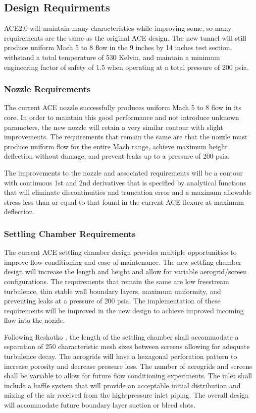 \subsection{Design Requirments}

ACE2.0 will maintain many characteristics while improving some, so many requirements are the same as the original ACE design. The new tunnel will still produce uniform Mach 5 to 8 flow in the 9 inches by 14 inches test section, withstand a total temperature of 530 Kelvin, and maintain a minimum engineering factor of safety of 1.5 when operating at a total pressure of 200 psia.

\subsubsection*{Nozzle Requirements}

The current ACE nozzle successfully produces uniform Mach 5 to 8 flow in its core. In order to maintain this good performance and not introduce unknown parameters, the new nozzle will retain a very similar contour with slight improvements. The requirements that remain the same are that the nozzle must produce uniform flow for the entire Mach range, achieve maximum height deflection without damage, and prevent leaks up to a pressure of 200 psia.

The improvements to the nozzle and associated requirements will be a contour with continuous 1st and 2nd derivatives that is specified by analytical functions that will eliminate discontinuities and truncation error and a maximum allowable stress less than or equal to that found in the current ACE flexure at maximum deflection.

\subsubsection*{Settling Chamber Requirements}

The current ACE settling chamber design provides multiple opportunities to improve flow conditioning and ease of maintenance. The new settling chamber design will increase the length and height and allow for variable aerogrid/screen configurations. The requirements that remain the same are low freestream turbulence, thin stable wall boundary layers, maximum uniformity, and preventing leaks at a pressure of 200 psia. The implementation of these requirements will be improved in the new design to achieve improved incoming flow into the nozzle.

Following Reshotko \cite{reshotko}, the length of the settling chamber shall accommodate a separation of 250 characteristic mesh sizes between screens allowing for adequate turbulence decay. The aerogrids will have a hexagonal perforation pattern to increase porosity and decrease pressure loss. The number of aerogrids and screens shall be variable to allow for future flow conditioning experiments. The inlet shall include a baffle system that will provide an acceptable initial distribution and mixing of the air received from the high-pressure inlet piping. The overall design will accommodate future boundary layer suction or bleed slots.

